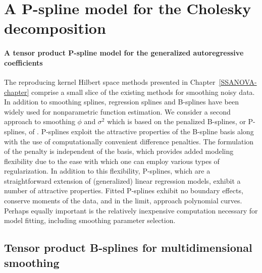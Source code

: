 
\chapter{A P-spline model for the Cholesky decomposition} \label{psplines-chapter}

\subsubsection{A tensor product P-spline model for the generalized autoregressive coefficients}


The reproducing kernel Hilbert space methods presented in Chapter~\ref{SSANOVA-chapter} comprise a small slice of the existing methods for smoothing noisy data. In addition to smoothing splines, regression splines \cite{eubank1999nonparametric} and B-splines \cite{de1978practical}  have been widely used for nonparametric function estimation. We consider a second approach to smoothing $\phi$ and $\sigma^2$ which is based on the penalized B-splines, or P-splines, of \cite{eilers1996flexible}. P-splines exploit the attractive properties of the B-spline basis along with the use of computationally convenient difference penalties. The formulation of the penalty is independent of the basis, which provides added modeling flexibility due to the ease with which one can employ various types of regularization. In addition to this flexibility, P-splines, which are a straightforward extension of (generalized) linear regression models, exhibit a number of attractive properties. Fitted P-splines exhibit no boundary effects, conserve moments of the data, and in the limit, approach polynomial curves. Perhaps equally important is the relatively inexpensive computation necessary for model fitting, including smoothing parameter selection.

\section{Tensor product B-splines for multidimensional smoothing}

